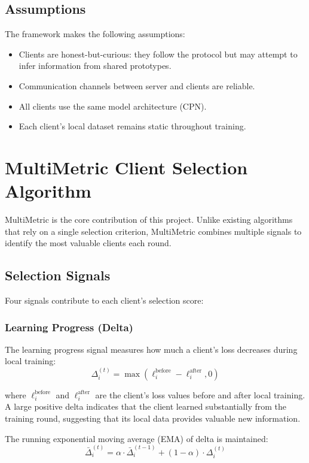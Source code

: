 \subsection{Assumptions}

The framework makes the following assumptions:

\begin{itemize}
    \item Clients are honest-but-curious: they follow the protocol but may attempt to infer information from shared prototypes.
    \item Communication channels between server and clients are reliable.
    \item All clients use the same model architecture (CPN).
    \item Each client's local dataset remains static throughout training.
\end{itemize}

\section{MultiMetric Client Selection Algorithm}

MultiMetric is the core contribution of this project. Unlike existing algorithms that rely on a single selection criterion, MultiMetric combines multiple signals to identify the most valuable clients each round.

\subsection{Selection Signals}

Four signals contribute to each client's selection score:

\subsubsection{Learning Progress (Delta)}

The learning progress signal measures how much a client's loss decreases during local training:
\[
\Delta_i^{(t)} = \max(\ell_i^{\text{before}} - \ell_i^{\text{after}}, 0)
\]

where \(\ell_i^{\text{before}}\) and \(\ell_i^{\text{after}}\) are the client's loss values before and after local training. A large positive delta indicates that the client learned substantially from the training round, suggesting that its local data provides valuable new information.

The running exponential moving average (EMA) of delta is maintained:
\[
\bar{\Delta}_i^{(t)} = \alpha \cdot \bar{\Delta}_i^{(t-1)} + (1-\alpha) \cdot \Delta_i^{(t)}
\]

